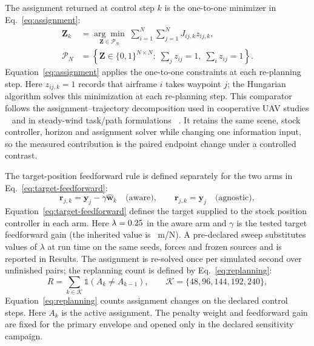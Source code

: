 The assignment returned at control step $k$ is the one-to-one minimizer in
Eq.~\eqref{eq:assignment}:
\begin{equation}
  \begin{aligned}
  \mathbf{Z}_k&=\underset{\mathbf{Z}\in\mathcal{P}_N}{\arg\min}\;
  \sum_{i=1}^{N}\sum_{j=1}^{N}J_{ij,k}z_{ij,k},\\
  \mathcal{P}_N&=\left\{\mathbf{Z}\in\{0,1\}^{N\times N}:\;
  \sum_jz_{ij}=1,\;\sum_iz_{ij}=1\right\}.
  \end{aligned}
  \label{eq:assignment}
\end{equation}
Equation~\eqref{eq:assignment} applies the one-to-one constraints at each
re-planning step. Here $z_{ij,k}=1$ records that airframe $i$ takes waypoint $j$; the Hungarian
algorithm solves this minimization at each re-planning step. This comparator
follows the assignment--trajectory decomposition used in cooperative UAV studies
~\cite{beard2002target,turpin2014goal} and in steady-wind task/path formulations
~\cite{luo2018integrated}. It retains the same scene, stock controller, horizon
and assignment solver while changing one information input, so the measured
contribution is the paired endpoint change under a controlled contrast.

The target-position feedforward rule is defined separately for the two arms in
Eq.~\eqref{eq:target-feedforward}:
\begin{equation}
  \mathbf{r}_{j,k}=\mathbf{y}_j-\gamma\widehat{\mathbf w}_k
  \quad\text{(aware)},
  \qquad
  \mathbf{r}_{j,k}=\mathbf{y}_j
  \quad\text{(agnostic)},
  \label{eq:target-feedforward}
\end{equation}
Equation~\eqref{eq:target-feedforward} defines the target supplied to the stock
position controller in each arm. Here $\lambda=0.25{}$ in the aware arm and $\gamma$ is the tested target
feedforward gain (the inherited value is \FeedforwardGainDefault{}~m/N). A
pre-declared sweep substitutes \LambdaGridSize{} values of $\lambda$ at run
time on the same seeds, forces and frozen sources and is reported in
Results. The assignment is re-solved once per
simulated second over unfinished pairs; the replanning count is defined by
Eq.~\eqref{eq:replanning}:
\begin{equation}
  R=\sum_{k\in\mathcal{K}}\mathbb{1}(A_k\ne A_{k-1}),
  \qquad \mathcal{K}=\{48,96,144,192,240\},
  \label{eq:replanning}
\end{equation}
Equation~\eqref{eq:replanning} counts assignment changes on the declared control
steps. Here $A_k$ is the active assignment. The penalty weight and feedforward gain
are fixed for the primary envelope and opened only in the declared sensitivity
campaign.

